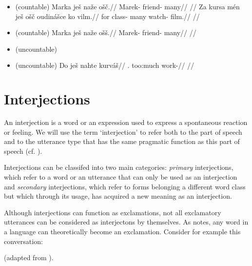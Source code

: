 \begin{itemize}
    \item {}  (countable)
    \ex
    \begingl
    \gla Marka ješ naže ošč.//
    \glb Marek-\Acc{} \Exst{} friend-\Gen{} many//
    \glft {}//
    \endgl
    \xe
    \ex
    \begingl
    \gla Za kursa mén ješ ošč oudinášce ko vilm.//
    \glb for class-\Acc{}  \Exst{} many watch-\Sup{} \Att{} film.//
    \glft {}//
    \endgl
    \xe
    \item {}  (countable)
    \ex
    \begingl
    \gla Marka ješ naže ošš.//
    \glb Marek-\Acc{} \Exst{} friend-\Gen{} many//
    \glft {}//
    \endgl
    \xe
    \item {}  (uncountable)
    \item {}  (uncountable)
    \ex
    \begingl
    \gla Do ješ nahte kurváš//
    \glb \First{}\Sg{}.\Acc{} \Exst{} too:much work-\SupN{}//
    \glft {}//
    \endgl
    \xe

\end{itemize}

\section{Interjections}

An interjection is a word or an expression used to express a spontaneous reaction or feeling. We will use the term `interjection' to refer both to the part of speech and to the utterance type that has the same pragmatic function as this part of speech (cf. \cite{ameka1992}).

Interjections can be classifed into two main categories: \emph{primary} interjections, which refer to a word or an utterance that can only be used as an interjection and \emph{secondary} interjections, which refer to forms belonging a different word class but which through its usage, has acquired a new meaning as an interjection.

Although interjections can function as exclamations, not all exclamatory utterances can be considered as interjectons by themselves. As \textcite{jovanovic2004} notes, any word in a language can theoretically become an exclamation. Consider for example this conversation:

\ex (adapted from \cite{jovanovic2004}).\\

